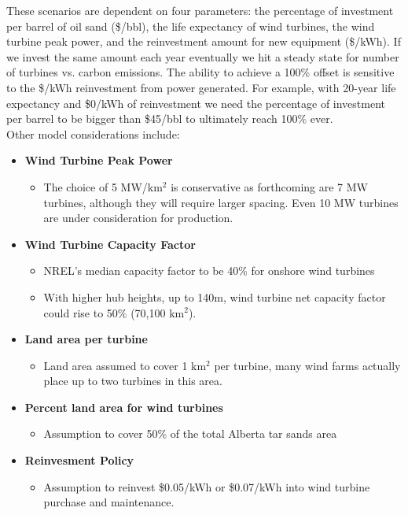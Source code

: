 \documentclass[11pt]{article}
\begin{document}
These scenarios are dependent on four parameters: the percentage of investment per barrel of oil sand (\$/bbl), the life expectancy of wind turbines, the wind turbine peak power, and the reinvestment amount for new equipment (\$/kWh). If we invest the same amount each year eventually we hit a steady state for number of turbines vs. carbon emissions. The ability to achieve a 100\% offset is sensitive to the \$/kWh reinvestment from power generated. For example, with 20-year life expectancy and \$0/kWh of reinvestment we need the percentage of investment per barrel to be bigger than \$45/bbl to ultimately reach 100\% ever.  \\

Other model considerations include:

\begin{itemize}
\item {\bf Wind Turbine Peak Power}
\begin{itemize}
\item The choice of 5 MW/km$^2$ is conservative as forthcoming are 7 MW turbines, although they will require larger spacing.  Even 10 MW turbines are under consideration for production.
\end{itemize}
\item {\bf Wind Turbine Capacity Factor}
\begin{itemize}
\item NREL's median capacity factor to be 40\% for onshore wind turbines
\item With higher hub heights, up to 140m, wind turbine net capacity factor could rise to 50\% (70,100 km$^2$).
\end{itemize}
\item {\bf Land area per turbine}
\begin{itemize}
\item Land area assumed to cover 1 km$^2$ per turbine, many wind farms actually place up to two turbines in this area.
\end{itemize}
\item {\bf Percent land area for wind turbines}
\begin{itemize}
\item Assumption to cover 50\% of the total Alberta tar sands area
\end{itemize}
\item {\bf Reinvesment Policy}
\begin{itemize}
\item Assumption to reinvest \$0.05/kWh or \$0.07/kWh into wind turbine purchase and maintenance.
\end{itemize}
\end{itemize}
\end{document}
